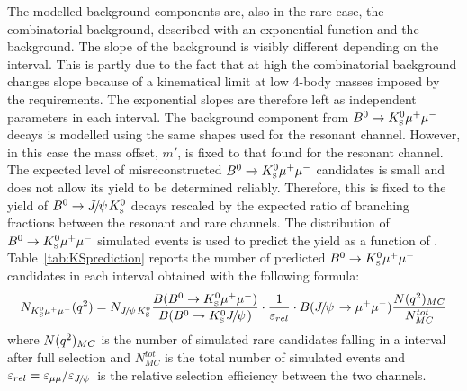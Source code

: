 The modelled background components are, also in the rare case,
the combinatorial background, described with an exponential function and the \KS background. 
The slope of the background is visibly different depending on the \qsq interval. This is partly due to the 
fact that at high \qsq the combinatorial background changes slope because of a kinematical limit at low 4-body
masses imposed by the \qsq requirements. The exponential slopes are therefore left as independent
parameters in each \qsq interval. %
The background component from $B^0\rightarrow K^0_{\rm\scriptscriptstyle S}\mu^+\mu^-$ decays is modelled using the same shapes used
for the resonant channel. However, in this case the mass offset, $m'$, is fixed to that found
for the resonant channel. The expected level of misreconstructed $B^0\rightarrow K^0_{\rm\scriptscriptstyle S}\mu^+\mu^-$
candidates is small and does not allow its yield to be determined reliably. Therefore, 
this is fixed to the yield of $\Bz\ra\jpsi\KS$ decays rescaled by the expected ratio
of branching fractions between the resonant and rare channels. The \qsq distribution of $B^0\rightarrow K^0_{\rm\scriptscriptstyle S}\mu^+\mu^-$ 
simulated events is used to predict the yield as a function of \qsq. Table~\ref{tab:KSprediction} reports the 
number of predicted $B^0\rightarrow K^0_{\rm\scriptscriptstyle S}\mu^+\mu^-$ candidates in each \qsq interval obtained with the following formula:
\begin{equation}
N_{\KS\mumu}(\qsq) = N_{\jpsi\KS}\frac{B(\Bz\ra\KS\mumu)}{B(\Bz\ra\KS\jpsi)}\cdot \frac{1}{\varepsilon_{rel}} \cdot B(\jpsi\ra\mumu) \frac{N(\qsq)_{MC}}{N^{tot}_{MC}} 
\end{equation}
where $N(q^2)_{MC}$ is the number of simulated rare candidates falling in a \qsq interval after full selection and $N^{tot}_{MC}$ 
is the total number of simulated events and \mbox{$\varepsilon_{rel} = \varepsilon_{\mu\mu} / \varepsilon_{\jpsi}$} is the relative selection efficiency between the two channels. 

